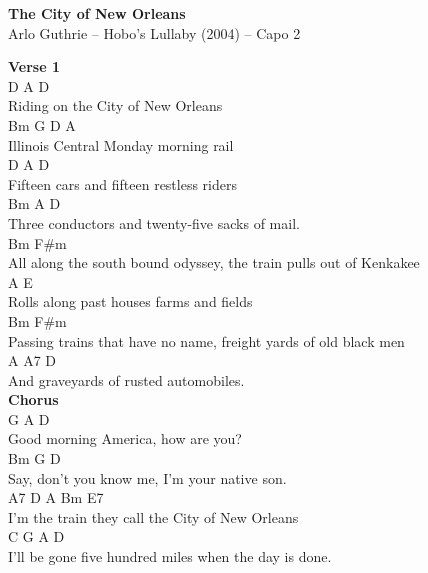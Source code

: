 \documentclass[a4paper]{article}
\begin{document}
    \begin{center}
        \textbf{The City of New Orleans}
        ~\\
        Arlo Guthrie -- Hobo's Lullaby (2004)
         -- Capo 2
    \end{center}
    {
        \scriptsize
        \textbf{Verse 1}
        ~\\
        {
            \cutive
            \obeyspaces
D           A       D   
\\
Riding on the City of New Orleans
\\
Bm               G              D    A
\\
Illinois Central Monday morning rail
\\
D                A                D   
\\
Fifteen cars and fifteen restless riders
\\
Bm                   A                    D  
\\
Three conductors and twenty-five sacks of mail.
\\
     Bm                                F\#m 
\\
All along the south bound odyssey, the train pulls out of Kenkakee
\\
A                                 E   
\\
Rolls along past houses farms and fields
\\
Bm                                F\#m
\\
Passing trains that have no name, freight yards of old black men
\\
    A             A7           D    
\\
And graveyards of rusted automobiles.
\\

        }
        \textbf{Chorus}
        ~\\
        {
            \cutive
            \obeyspaces
G             A           D      
\\
Good morning America, how are you?                                                       
\\
     Bm                 G               D    
\\
Say, don't you know me, I'm your native son.
\\
A7       D                   A       Bm         E7    
\\
I'm  the train they call the City of New Orleans
\\
        C         G       A                     D    
\\
I'll be gone five hundred miles when the day is done.
\\

}}
\end{document}
